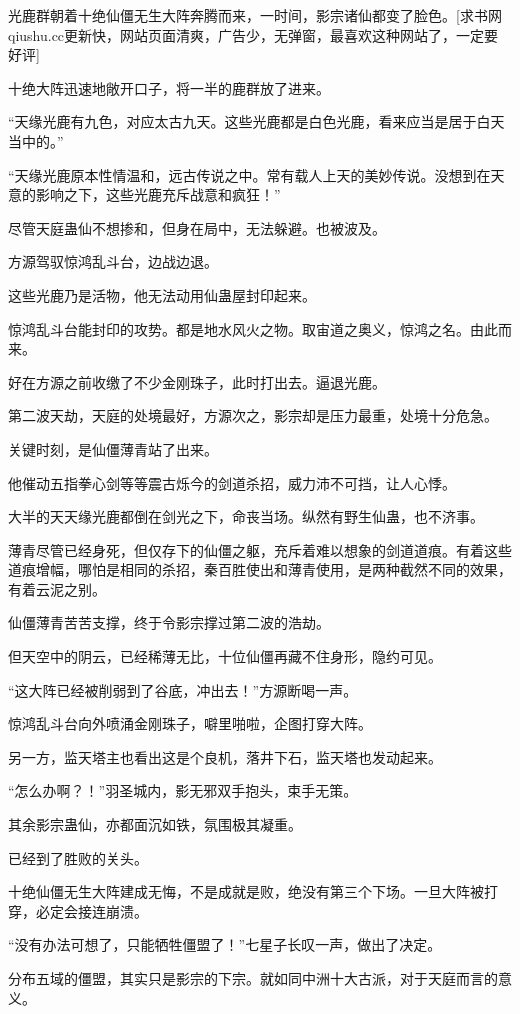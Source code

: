 \begin{this_body}
光鹿群朝着十绝仙僵无生大阵奔腾而来，一时间，影宗诸仙都变了脸色。[求书网qiushu.cc更新快，网站页面清爽，广告少，无弹窗，最喜欢这种网站了，一定要好评]

十绝大阵迅速地敞开口子，将一半的鹿群放了进来。

“天缘光鹿有九色，对应太古九天。这些光鹿都是白色光鹿，看来应当是居于白天当中的。”

“天缘光鹿原本性情温和，远古传说之中。常有载人上天的美妙传说。没想到在天意的影响之下，这些光鹿充斥战意和疯狂！”

尽管天庭蛊仙不想掺和，但身在局中，无法躲避。也被波及。

方源驾驭惊鸿乱斗台，边战边退。

这些光鹿乃是活物，他无法动用仙蛊屋封印起来。

惊鸿乱斗台能封印的攻势。都是地水风火之物。取宙道之奥义，惊鸿之名。由此而来。

好在方源之前收缴了不少金刚珠子，此时打出去。逼退光鹿。

第二波天劫，天庭的处境最好，方源次之，影宗却是压力最重，处境十分危急。

关键时刻，是仙僵薄青站了出来。

他催动五指拳心剑等等震古烁今的剑道杀招，威力沛不可挡，让人心悸。

大半的天天缘光鹿都倒在剑光之下，命丧当场。纵然有野生仙蛊，也不济事。

薄青尽管已经身死，但仅存下的仙僵之躯，充斥着难以想象的剑道道痕。有着这些道痕增幅，哪怕是相同的杀招，秦百胜使出和薄青使用，是两种截然不同的效果，有着云泥之别。

仙僵薄青苦苦支撑，终于令影宗撑过第二波的浩劫。

但天空中的阴云，已经稀薄无比，十位仙僵再藏不住身形，隐约可见。

“这大阵已经被削弱到了谷底，冲出去！”方源断喝一声。

惊鸿乱斗台向外喷涌金刚珠子，噼里啪啦，企图打穿大阵。

另一方，监天塔主也看出这是个良机，落井下石，监天塔也发动起来。

“怎么办啊？！”羽圣城内，影无邪双手抱头，束手无策。

其余影宗蛊仙，亦都面沉如铁，氛围极其凝重。

已经到了胜败的关头。

十绝仙僵无生大阵建成无悔，不是成就是败，绝没有第三个下场。一旦大阵被打穿，必定会接连崩溃。

“没有办法可想了，只能牺牲僵盟了！”七星子长叹一声，做出了决定。

分布五域的僵盟，其实只是影宗的下宗。就如同中洲十大古派，对于天庭而言的意义。


\end{this_body}

